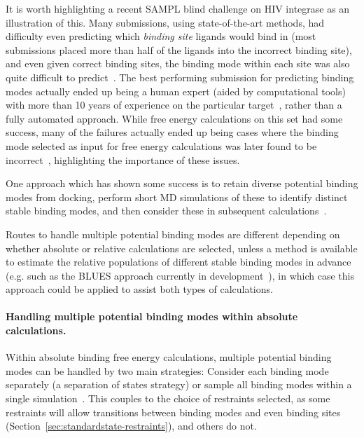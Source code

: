 \documentclass[9pt,bestpractices]{livecoms}
\begin{document}
It is worth highlighting a recent SAMPL blind challenge on HIV integrase as an illustration of this. 
Many submissions, using state-of-the-art methods, had difficulty even predicting which \emph{binding site} ligands would bind in (most submissions placed more than half of the ligands into the incorrect binding site), and even given correct binding sites, the binding mode within each site was also quite difficult to predict~\cite{mobley2014blind}.
The best performing submission for predicting binding modes actually ended up being a human expert (aided by computational tools) with more than 10 years of experience on the particular target~\cite{voet2014combining}, rather than a fully automated approach.
While free energy calculations on this set had some success, many of the failures actually ended up being cases where the binding mode selected as input for free energy calculations was later found to be incorrect~\cite{gallicchio2014virtual}, highlighting the importance of these issues.

One approach which has shown some success is to retain diverse potential binding modes from docking, perform short MD simulations of these to identify distinct stable binding modes, and then consider these in subsequent calculations~\cite{gallicchio2014virtual, mobley2006use,rocklin2013blind, boyce2009predicting, mobley2007predicting}.

Routes to handle multiple potential binding modes are different depending on whether absolute or relative calculations are selected, unless a method is available to estimate the relative populations of different stable binding modes in advance (e.g. such as the BLUES approach currently in development~\cite{gill2018binding}), in which case this approach could be applied to assist both types of calculations.



\paragraph{Handling multiple potential binding modes within absolute calculations.}
Within absolute binding free energy calculations, multiple potential binding modes can be handled by two main strategies: Consider each binding mode separately (a separation of states strategy) or sample all binding modes within a single simulation~\cite{mobley2012perspective}.
This couples to the choice of restraints selected, as some restraints will allow transitions between binding modes and even binding sites (Section~\ref{sec:standardstate-restraints}), and others do not.
\end{document}
